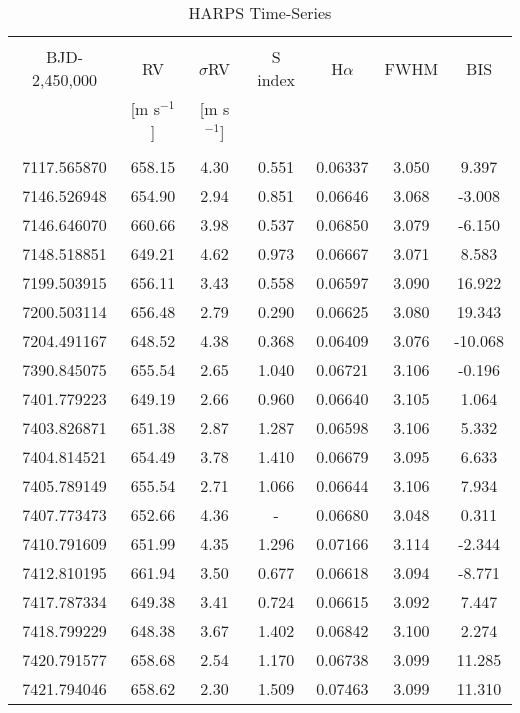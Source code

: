 \begin{table}
\tiny
\renewcommand{\arraystretch}{0.7}
\centering
\caption[]{HARPS Time-Series}
\label{table:data}
\begin{tabular}{ccccccc}
\hline \\ [-1ex]
BJD-2,450,000 & RV & $\sigma$RV & S index & H$\alpha$ & FWHM & BIS \\
& [m s$^{-1}$] & [m s$^{-1}$] &  &  & & \\
\hline \\ [-1ex]
7117.565870 & 658.15 & 4.30 & 0.551 & 0.06337 & 3.050 & 9.397 \\
7146.526948 & 654.90 & 2.94 & 0.851 & 0.06646 & 3.068 & -3.008 \\
7146.646070 & 660.66 & 3.98 & 0.537 & 0.06850 & 3.079 & -6.150 \\
7148.518851 & 649.21 & 4.62 & 0.973 & 0.06667 & 3.071 & 8.583 \\
7199.503915 & 656.11 & 3.43 & 0.558 & 0.06597 & 3.090 & 16.922 \\
7200.503114 & 656.48 & 2.79 & 0.290 & 0.06625 & 3.080 & 19.343 \\
7204.491167 & 648.52 & 4.38 & 0.368 & 0.06409 & 3.076 & -10.068 \\
7390.845075 & 655.54 & 2.65 & 1.040 & 0.06721 & 3.106 & -0.196 \\
7401.779223 & 649.19 & 2.66 & 0.960 & 0.06640 & 3.105 & 1.064 \\
7403.826871 & 651.38 & 2.87 & 1.287 & 0.06598 & 3.106 & 5.332 \\
7404.814521 & 654.49 & 3.78 & 1.410 & 0.06679 & 3.095 & 6.633 \\
7405.789149 & 655.54 & 2.71 & 1.066 & 0.06644 & 3.106 & 7.934 \\
7407.773473 & 652.66 & 4.36 & - & 0.06680 & 3.048 & 0.311 \\
7410.791609 & 651.99 & 4.35 & 1.296 & 0.07166 & 3.114 & -2.344 \\
7412.810195 & 661.94 & 3.50 & 0.677 & 0.06618 & 3.094 & -8.771 \\
7417.787334 & 649.38 & 3.41 & 0.724 & 0.06615 & 3.092 & 7.447 \\
7418.799229 & 648.38 & 3.67 & 1.402 & 0.06842 & 3.100 & 2.274 \\
7420.791577 & 658.68 & 2.54 & 1.170 & 0.06738 & 3.099 & 11.285 \\
7421.794046 & 658.62 & 2.30 & 1.509 & 0.07463 & 3.099 & 11.310 \\

\end{tabular}
\end{table}
